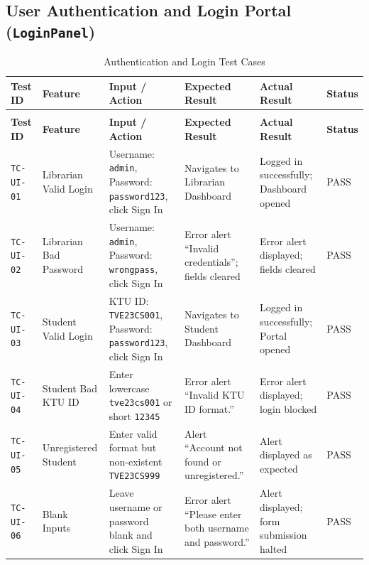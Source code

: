 \subsection{User Authentication and Login Portal (\texttt{LoginPanel})}
{\footnotesize
\setlength{\tabcolsep}{3pt}
\begin{longtable}{>{\raggedright\arraybackslash}p{1.6cm} >{\raggedright\arraybackslash}p{2.1cm} >{\raggedright\arraybackslash}p{2.5cm} >{\raggedright\arraybackslash}p{3.1cm} >{\raggedright\arraybackslash}p{3.1cm} >{\centering\arraybackslash}p{1.4cm}}
\caption{Authentication and Login Test Cases} \label{tab:test_ui_auth} \\
\toprule
\textbf{Test ID} & \textbf{Feature} & \textbf{Input / Action} & \textbf{Expected Result} & \textbf{Actual Result} & \textbf{Status} \\
\midrule
\endfirsthead
\multicolumn{6}{c}{{\bfseries Table \thetable\ continued from previous page}} \\
\toprule
\textbf{Test ID} & \textbf{Feature} & \textbf{Input / Action} & \textbf{Expected Result} & \textbf{Actual Result} & \textbf{Status} \\
\midrule
\endhead
\bottomrule
\endfoot
\texttt{TC-UI-01} & Librarian Valid Login & Username: \texttt{admin}, Password: \texttt{password123}, click Sign In & Navigates to Librarian Dashboard & Logged in successfully; Dashboard opened & PASS \\
\midrule
\texttt{TC-UI-02} & Librarian Bad Password & Username: \texttt{admin}, Password: \texttt{wrongpass}, click Sign In & Error alert ``Invalid credentials''; fields cleared & Error alert displayed; fields cleared & PASS \\
\midrule
\texttt{TC-UI-03} & Student Valid Login & KTU ID: \texttt{TVE23CS001}, Password: \texttt{password123}, click Sign In & Navigates to Student Dashboard & Logged in successfully; Portal opened & PASS \\
\midrule
\texttt{TC-UI-04} & Student Bad KTU ID & Enter lowercase \texttt{tve23cs001} or short \texttt{12345} & Error alert ``Invalid KTU ID format.'' & Error alert displayed; login blocked & PASS \\
\midrule
\texttt{TC-UI-05} & Unregistered Student & Enter valid format but non-existent \texttt{TVE23CS999} & Alert ``Account not found or unregistered.'' & Alert displayed as expected & PASS \\
\midrule
\texttt{TC-UI-06} & Blank Inputs & Leave username or password blank and click Sign In & Error alert ``Please enter both username and password.'' & Alert displayed; form submission halted & PASS \\
\end{longtable}
}

